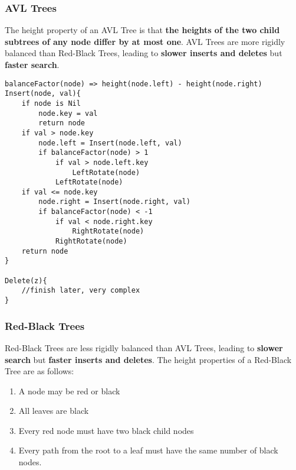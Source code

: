 \documentclass{article}
\begin{document}
\subsubsection{AVL Trees}
The height property of an AVL Tree is that {\bf the heights of the two child subtrees of any node differ by at most one}. AVL Trees are more rigidly balanced than Red-Black Trees, leading to {\bf slower inserts and deletes} but {\bf faster search}.

\begin{minipage}{\linewidth}
\begin{lstlisting}[style=pseudo]
balanceFactor(node) => height(node.left) - height(node.right)
Insert(node, val){
	if node is Nil
		node.key = val
		return node
	if val > node.key
		node.left = Insert(node.left, val)
		if balanceFactor(node) > 1
			if val > node.left.key
				LeftRotate(node)
			LeftRotate(node)
	if val <= node.key
		node.right = Insert(node.right, val)
		if balanceFactor(node) < -1
			if val < node.right.key
				RightRotate(node)
			RightRotate(node)
	return node
}

Delete(z){
	//finish later, very complex
}
\end{lstlisting}
\end{minipage}

\subsubsection{Red-Black Trees}
Red-Black Trees are less rigidly balanced than AVL Trees, leading to {\bf slower search} but {\bf faster inserts and deletes}. The height properties of a Red-Black Tree are as follows:
\begin{enumerate}
	\item A node may be red or black
	\item All leaves are black
	\item Every red node must have two black child nodes
	\item Every path from the root to a leaf must have the same number of black nodes.
\end{enumerate}
\end{document}
